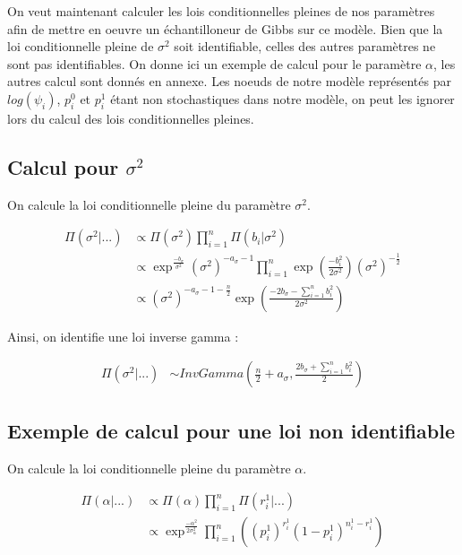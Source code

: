\documentclass[
]{article}
\begin{document}
On veut maintenant calculer les lois conditionnelles pleines de nos
paramètres afin de mettre en oeuvre un échantilloneur de Gibbs sur ce
modèle. Bien que la loi conditionnelle pleine de \(\sigma^2\) soit
identifiable, celles des autres paramètres ne sont pas identifiables. On
donne ici un exemple de calcul pour le paramètre \(\alpha\), les autres
calcul sont donnés en annexe. Les noeuds de notre modèle représentés par
\(log(\psi_i)\), \(p_i^0\) et \(p_i^1\) étant non stochastiques dans
notre modèle, on peut les ignorer lors du calcul des lois
conditionnelles pleines.

\hypertarget{calcul-pour-sigma2}{%
\subsection{\texorpdfstring{Calcul pour
\(\sigma^2\)}{Calcul pour \textbackslash sigma\^{}2}}\label{calcul-pour-sigma2}}

On calcule la loi conditionnelle pleine du paramètre \(\sigma^2\).

\begin{align*}
\Pi(\sigma^2|...) &\propto \Pi(\sigma^2) \prod_{i=1}^n\Pi(b_i|\sigma^2) \\
&\propto \exp^{\frac{-b_{\sigma}}{\sigma^2}}(\sigma^2)^{-a_{\sigma}-1}\prod_{i=1}^{n} \exp\left(\frac{-b_i^2}{2\sigma^2}\right)(\sigma^2)^{-\frac{1}{2}} \\
&\propto (\sigma^2)^{-a_{\sigma}-1-\frac{n}{2}} \exp\left(\frac{-2b_{\sigma}-\sum\limits_{i=1}^n b_i^2}{2\sigma^2}\right)
\end{align*}

Ainsi, on identifie une loi inverse gamma :

\begin{align*}
\Pi(\sigma^2|...) &\sim InvGamma(\frac{n}{2}+a_{\sigma},\frac{2b_{\sigma}+\sum\limits_{i=1}^n b_i^2}{2})
\end{align*}

\hypertarget{exemple-de-calcul-pour-une-loi-non-identifiable}{%
\subsection{Exemple de calcul pour une loi non
identifiable}\label{exemple-de-calcul-pour-une-loi-non-identifiable}}

On calcule la loi conditionnelle pleine du paramètre \(\alpha\).

\begin{align*}
\Pi(\alpha|...) &\propto \Pi(\alpha) \prod_{i=1}^n\Pi(r_i^1|...) \\
&\propto \exp^{\frac{-\alpha^2}{2\sigma_{\alpha}^2}}\prod_{i=1}^n \left((p_i^1)^{r_i^1}(1-p_i^1)^{n_i^1-r_i^1}\right)
\end{align*}
\end{document}

